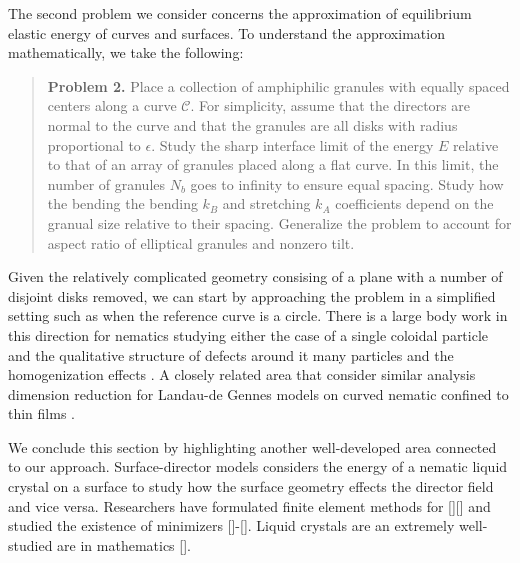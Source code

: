 The second problem we consider concerns the approximation
of equilibrium elastic energy of curves and surfaces.
To understand the approximation mathematically, we take the following:
\begin{quotation}
  \textbf{Problem 2.} Place a collection of
  amphiphilic granules
with equally spaced centers along a curve $\mathcal{C}$.
For simplicity, assume that the directors are normal to the curve
and that the granules are all disks with radius proportional to $\epsilon$. 
Study the sharp interface limit of the energy $E$ 
relative to that of an array of granules placed along a flat curve. 
In this limit, the number of granules $N_b$ goes to infinity
to ensure equal spacing.
Study how the bending the bending $k_B$ and stretching $k_A$ coefficients
depend on the granual size relative to their spacing.
Generalize the problem to account for aspect ratio of elliptical granules
and nonzero tilt. 
\end{quotation}
Given the relatively complicated geometry consising
of a plane with a number of disjoint disks removed, 
we can start by approaching the problem in a simplified
setting such as when the reference curve is a circle.
There is a large body work in this direction for nematics
studying either the case of a single coloidal particle and
the qualitative structure of defects around it
\cite{Alama2015MinimizersOT, Alama2021SaturnRD, PhysRevE.96.042702}
many particles and the homogenization effects
\cite{Canevari2019DesignOE,doi:10.1137/18M1163919,doi:10.1137/18M1163919,BERLYAND200597,doi:10.1137/130910348}.
A closely related area that consider similar analysis
dimension reduction for
Landau-de Gennes models on curved nematic confined to thin films
\cite{Golovaty2017DimensionRF, Golovaty2015DimensionRF,doi:10.1142/S0218202516500470, FoFrLe07}.

We conclude this section by highlighting another well-developed
area connected to our approach.  Surface-director models 
considers the energy of a nematic liquid crystal on a surface to study how the
surface geometry effects the director field and vice versa. Researchers
have formulated finite element methods for [][] and studied the existence
of minimizers []-[].
Liquid crystals are an extremely well-studied are in mathematics [].


